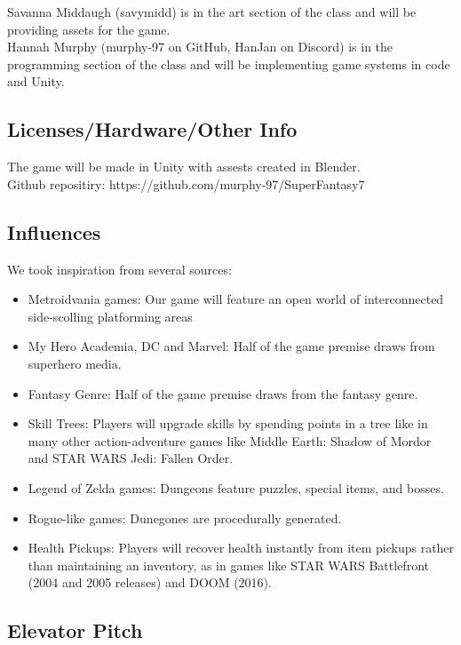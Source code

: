 \documentclass[titlepage]{article}
\begin{document}
Savanna Middaugh (savymidd) is in the art section of the class and will be 
providing assets for the game. \\

Hannah Murphy (murphy-97 on GitHub, HanJan on Discord) is in the programming
section of the class and will be implementing game systems in code and Unity.

\subsection*{Licenses/Hardware/Other Info}
The game will be made in Unity with assests created in Blender.  \\

Github repositiry: https://github.com/murphy-97/SuperFantasy7

\subsection*{Influences}
We took inspiration from several sources:

\begin{itemize}
    \item Metroidvania games: Our game will feature an open world of
    interconnected side-scolling platforming areas
    \item My Hero Academia, DC and Marvel: Half of the game premise draws from
    superhero media.
    \item Fantasy Genre: Half of the game premise draws from the fantasy genre.
    \item Skill Trees: Players will upgrade skills by spending points in a tree
    like in many other action-adventure games like Middle Earth: Shadow of
    Mordor and STAR WARS Jedi: Fallen Order.
    \item Legend of Zelda games: Dungeons feature puzzles, special items, and
    bosses.
    \item Rogue-like games: Dunegones are procedurally generated.
    \item Health Pickups: Players will recover health instantly from item
    pickups rather than maintaining an inventory, as in games like STAR WARS
    Battlefront (2004 and 2005 releases) and DOOM (2016). 
\end{itemize}

\subsection*{Elevator Pitch}
\end{document}
